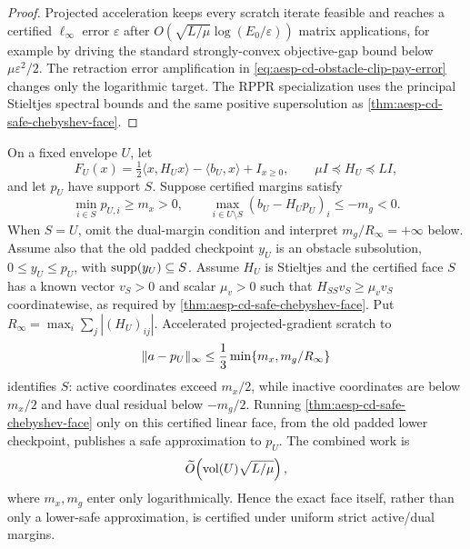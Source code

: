 \begin{proof}
Projected acceleration keeps every scratch iterate feasible and reaches a
certified $\ell_\infty$ error $\varepsilon$ after
$O(\sqrt{L/\mu}\log(E_0/\varepsilon))$ matrix applications, for example by
driving the standard strongly-convex objective-gap bound below
$\mu\varepsilon^2/2$.  The retraction error amplification in
\cref{eq:aesp-cd-obstacle-clip-pay-error} changes only the logarithmic target.
The RPPR specialization uses the principal Stieltjes spectral bounds and the
same positive supersolution as
\cref{thm:aesp-cd-safe-chebyshev-face}.
\end{proof}

\begin{corollary}
\label{cor:aesp-cd-margin-obstacle-primitive}
On a fixed envelope $U$, let
\begin{equation*}
 F_U(x)=\tfrac12\langle x,H_Ux\rangle-\langle b_U,x\rangle
       +I_{x\geq0},
 \qquad \mu I\preceq H_U\preceq LI,
\end{equation*}
and let $p_U$ have support $S$.  Suppose certified margins satisfy
\begin{equation*}
 \min_{i\in S}p_{U,i}\geq m_x>0,\qquad
 \max_{i\in U\setminus S}(b_U-H_Up_U)_i\leq-m_g<0.
\end{equation*}
When $S=U$, omit the dual-margin condition and interpret
$m_g/R_\infty=+\infty$ below.
Assume also that the old padded checkpoint $y_U$ is an obstacle subsolution,
$0\leq y_U\leq p_U$, with $\operatorname{supp}(y_U)\subseteq S$.
Assume $H_U$ is Stieltjes and the certified face $S$ has a known vector
$v_S>0$ and scalar $\mu_v>0$ such that
$H_{SS}v_S\geq\mu_vv_S$ coordinatewise, as required by
\cref{thm:aesp-cd-safe-chebyshev-face}.
Put $R_\infty=\max_i\sum_j|(H_U)_{ij}|$.  Accelerated projected-gradient
scratch to
\begin{equation*}
 \lVert a-p_U\rVert_\infty
 \leq\frac13\min\{m_x,m_g/R_\infty\}
\end{equation*}
identifies $S$: active coordinates exceed $m_x/2$, while inactive
coordinates are below $m_x/2$ and have dual residual below $-m_g/2$.
Running
\cref{thm:aesp-cd-safe-chebyshev-face} only on this certified linear face,
from the old padded lower checkpoint, publishes a safe approximation to
$p_U$.  The combined work is
\begin{equation*}
 \widetilde O\!\left(
   \operatorname{vol}(U)\sqrt{L/\mu}\right),
\end{equation*}
where $m_x,m_g$ enter only logarithmically.  Hence
the exact face itself, rather than only a lower-safe approximation, is
certified under uniform strict active/dual margins.
\end{corollary}

